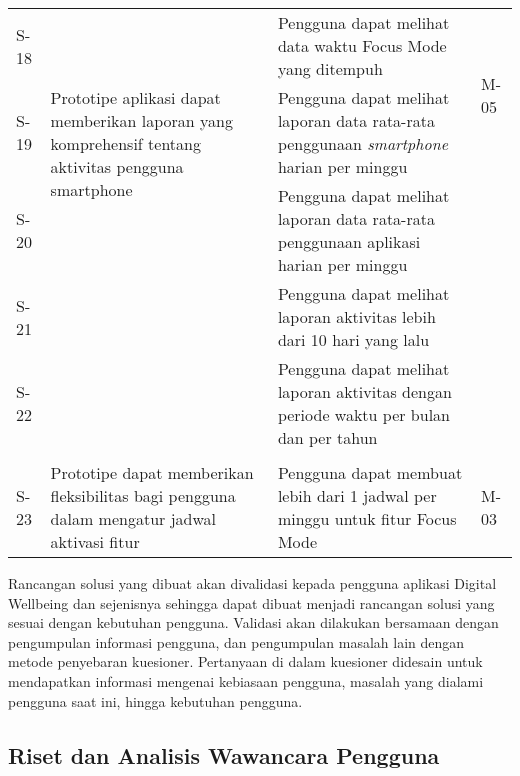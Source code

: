 \begin{longtable}[c]{|p{}|p{}|p{}|p{}|}
  S-18
  & \multirow{3}{0.3\textwidth}{Prototipe aplikasi dapat memberikan laporan yang komprehensif tentang aktivitas pengguna smartphone}
  & Pengguna dapat melihat data waktu Focus Mode yang ditempuh
  & \multirow{2}{0.1\textwidth}{M-05} \\ \cline{1-1} \cline{3-3}

  S-19 &  
  & Pengguna dapat melihat laporan data rata-rata penggunaan \textit{smartphone} harian per minggu 
  & \\ \cline{1-1} \cline{3-3}

  S-20 &  
  & Pengguna dapat melihat laporan data rata-rata penggunaan aplikasi harian per minggu 
  & \\ \cline{1-1} \cline{3-3}

  S-21 &  
  & Pengguna dapat melihat laporan aktivitas lebih dari 10 hari yang lalu
  & \\ \cline{1-1} \cline{3-3}

  S-22 &  
  & Pengguna dapat melihat laporan aktivitas dengan periode waktu per bulan dan per tahun 
  & \\ \cline{1-1} \cline{3-3}

  & \\ \hline
  S-23
  & \multirow{2}{0.3\textwidth}{Prototipe dapat memberikan fleksibilitas bagi
  pengguna dalam mengatur jadwal aktivasi fitur}
  & Pengguna dapat membuat lebih dari 1 jadwal per minggu untuk fitur Focus Mode
  & \multirow{4}{0.1\textwidth}{M-03} \\ \cline{1-1} \cline{3-3}

\end{longtable}

\FloatBarrier

Rancangan solusi yang dibuat akan divalidasi kepada pengguna aplikasi Digital Wellbeing dan sejenisnya sehingga dapat dibuat menjadi rancangan solusi yang sesuai dengan kebutuhan pengguna. Validasi akan dilakukan bersamaan dengan pengumpulan informasi pengguna, dan pengumpulan masalah lain dengan metode penyebaran kuesioner. Pertanyaan di dalam kuesioner didesain untuk mendapatkan informasi mengenai kebiasaan pengguna, masalah yang dialami pengguna saat ini, hingga kebutuhan pengguna.

\subsection{Riset dan Analisis Wawancara Pengguna}


